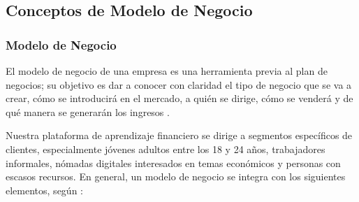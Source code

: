 {}
\subsection*{Conceptos de Modelo de Negocio}

{}
\subsubsection*{Modelo de Negocio}


El modelo de negocio de una empresa es una herramienta previa al plan de negocios; su objetivo es dar a conocer con claridad el tipo de negocio que se va a crear, cómo se introducirá en el mercado, a quién se dirige, cómo se venderá y de qué manera se generarán los ingresos \parencite{Economipedia01}. 

Nuestra plataforma de aprendizaje financiero se dirige a segmentos específicos de clientes, especialmente jóvenes adultos entre los 18 y 24 años, trabajadores informales, nómadas digitales interesados en temas económicos y personas con escasos recursos. En general, un modelo de negocio se integra con los siguientes elementos, según \textcite{BusinessModel01}:


